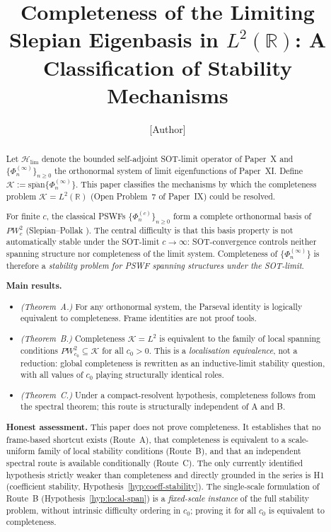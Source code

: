 \documentclass[12pt,a4paper]{amsart}
\theoremstyle{definition}
\theoremstyle{remark}
\newcommand{\Hlim}{\mathcal{H}_{\lim}}
\newcommand{\Phiinf}[1]{\Phi_{#1}^{(\infty)}}
\newcommand{\Phic}[2]{\Phi_{#2}^{(#1)}}
\newcommand{\PW}{PW}
\newcommand{\Kspace}{\mathcal{K}}
\begin{document}
\title[Completeness of the Limiting Slepian Eigenbasis]{%
  Completeness of the Limiting Slepian Eigenbasis in $L^2(\mathbb{R})$:
  A Classification of Stability Mechanisms}

\author{[Author]}
\address{[Address]}
\email{[Email]}

\begin{abstract}
Let $\Hlim$ denote the bounded self-adjoint SOT-limit operator
of Paper~X and $\{\Phiinf{n}\}_{n \ge 0}$ the orthonormal
system of limit eigenfunctions of Paper~XI.
Define $\Kspace := \overline{\mathrm{span}}\{\Phiinf{n}\}$.
This paper classifies the mechanisms by which the completeness
problem $\Kspace = L^2(\mathbb{R})$ (Open Problem~7 of Paper~IX)
could be resolved.

\medskip
For finite $c$, the classical PSWFs $\{\Phic{c}{n}\}_{n \ge 0}$
form a complete orthonormal basis of $\PW_c^2$ (Slepian--Pollak
\cite{Slepian1961}).
The central difficulty is that this basis property is not
automatically stable under the SOT-limit $c \to \infty$:
SOT-convergence controls neither spanning structure nor
completeness of the limit system.
Completeness of $\{\Phiinf{n}\}$ is therefore a
\emph{stability problem for PSWF spanning structures under
the SOT-limit}.

\medskip
\textbf{Main results.}
\begin{itemize}
\item \emph{(Theorem~A.)} For any orthonormal system,
  the Parseval identity is logically equivalent to completeness.
  Frame identities are not proof tools.
\item \emph{(Theorem~B.)} Completeness $\Kspace=L^2$ is equivalent
  to the family of local spanning conditions
  $\PW_{c_0}^2 \subseteq \Kspace$ for all $c_0>0$.
  This is a \emph{localisation equivalence}, not a reduction:
  global completeness is rewritten as an
  inductive-limit stability question, with all
  values of $c_0$ playing structurally identical roles.
\item \emph{(Theorem~C.)} Under a compact-resolvent
  hypothesis, completeness follows from the spectral theorem;
  this route is structurally independent of A and B.
\end{itemize}

\medskip
\textbf{Honest assessment.}
This paper does not prove completeness.
It establishes that no frame-based shortcut exists (Route~A),
that completeness is equivalent to a scale-uniform
family of local stability conditions (Route~B),
and that an independent spectral route is available
conditionally (Route~C).
The only currently identified hypothesis strictly weaker than
completeness and directly grounded in the series
is H1 (coefficient stability,
Hypothesis~\ref{hyp:coeff-stability}).
The single-scale formulation of Route~B
(Hypothesis~\ref{hyp:local-span}) is a
\emph{fixed-scale instance} of the full stability problem,
without intrinsic difficulty ordering in $c_0$;
proving it for all $c_0$ is equivalent to completeness.
\end{abstract}
\end{document}
